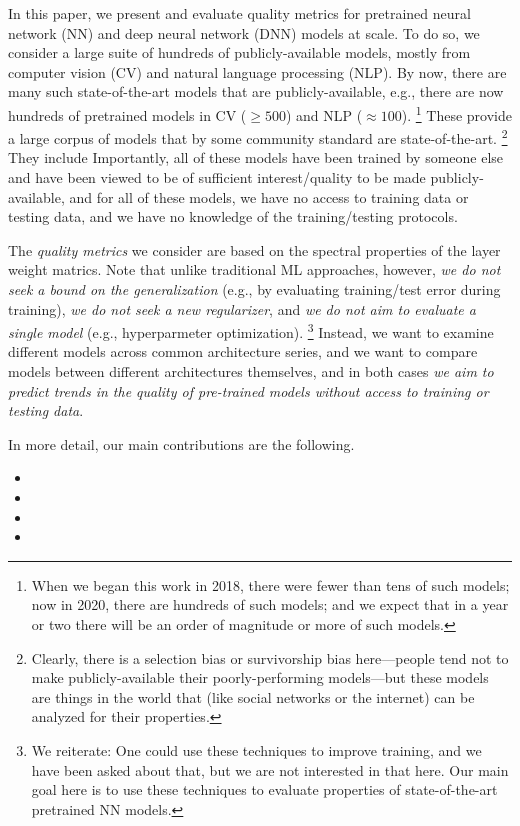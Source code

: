 In this paper, we present and evaluate quality metrics for pretrained neural network (NN) and deep neural network (DNN) models at scale.
To do so, we consider a large suite of hundreds of publicly-available models, mostly from computer vision (CV) and natural language processing (NLP).
%
By now, there are many such state-of-the-art models that are publicly-available, e.g., 
there are now hundreds of pretrained models in CV ($\ge 500$) and NLP ($\approx 100$).%
\footnote{When we began this work in 2018, there were fewer than tens of such models; now in 2020, there are hundreds of such models; and we expect that in a year or two there will be an order of magnitude or more of such models.}
These provide a large corpus of models that by some community standard are state-of-the-art.%
\footnote{Clearly, there is a selection bias or survivorship bias here---people tend not to make publicly-available their poorly-performing models---but these models are things in the world that (like social networks or the internet) can be analyzed for their properties.}
They include 
Importantly, all of these models have been trained by someone else and have been viewed to be of sufficient interest/quality to be made publicly-available, and for all of these models, we have no access to training data or testing data, and we have no knowledge of the training/testing protocols. 

The \emph{quality metrics} we consider are based on the spectral properties of the layer weight matrics.
Note that unlike traditional ML approaches, however, \emph{we do not seek a bound on the generalization} (e.g., by evaluating training/test error during training), \emph{we do not seek a new regularizer}, and \emph{we do not aim to evaluate a single model} (e.g., hyperparmeter optimization).%
\footnote{We reiterate: One could use these techniques to improve training, and we have been asked about that, but we are not interested in that here. Our main goal here is to use these techniques to evaluate properties of state-of-the-art pretrained NN models.}
Instead, we want to examine different models across common architecture series, and we want to compare models between different architectures themselves, and in both cases \emph{we aim to predict trends in the quality of pre-trained models without access to training or testing data}.  


In more detail, our main contributions are the following.
\begin{itemize}
\item {}
\item {}
\item {}
\item {}
\end{itemize}


